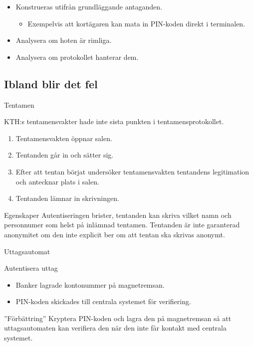 \documentclass{beamer}
\theoremstyle{definition}
\theoremstyle{remark}
\begin{document}
\begin{frame}{\insertsubsectionhead}
  \begin{itemize}
    \item Konstrueras utifrån grundläggande antaganden.
      \begin{itemize}
        \item Exempelvis att kortägaren kan mata in PIN-koden direkt 
          i terminalen.
    \end{itemize}
    \item Analysera om hoten är rimliga.
    \item Analysera om protokollet hanterar dem.
  \end{itemize}
\end{frame}

\subsection{Ibland blir det fel}

\begin{frame}{\insertsubsectionhead}{Tentamen}
  \begin{example}
    KTH:s tentamensvakter hade inte sista punkten i tentamensprotokollet.
    \begin{enumerate}
      \item Tentamensvakten öppnar salen.
      \item Tentanden går in och sätter sig.
      \item Efter att tentan börjat undersöker tentamensvakten tentandens 
        legitimation och antecknar plats i salen.
      \item Tentanden lämnar in skrivningen.
    \end{enumerate}
  \end{example}
  \begin{block}{Egenskaper}
    Autentiseringen brister, tentanden kan skriva vilket namn och personnumer 
    som helst på inlämnad tentamen.
    Tentanden är inte garanterad anonymitet om den inte explicit ber om att 
    tentan ska skrivas anonymt.
  \end{block}
\end{frame}

\begin{frame}{\insertsubsectionhead}{Uttagsautomat}
  \begin{block}{Autentisera uttag}
    \begin{itemize}
      \item Banker lagrade kontonummer på magnetremsan.
      \item PIN-koden skickades till centrala systemet för verifiering.
    \end{itemize}
  \end{block}
  \begin{block}{''Förbättring''}
    Kryptera PIN-koden och lagra den på magnetremsan så att uttagsautomaten kan 
    verifiera den när den inte får kontakt med centrala systemet.
  \end{block}
\end{frame}
\end{document}
